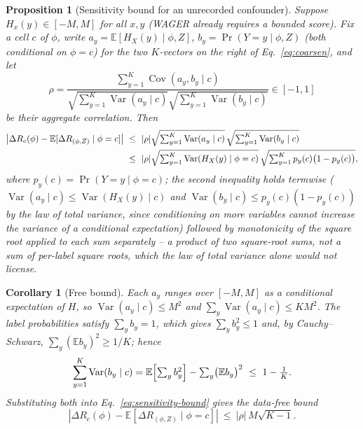 \documentclass[preprint,times,10pt,a4paper]{elsarticle}
\theoremstyle{plain}
\newtheorem{proposition}{Proposition}
\newtheorem{corollary}{Corollary}
\theoremstyle{definition}
\begin{document}
\begin{proposition}[Sensitivity bound for an unrecorded confounder]\label{prop:sensitivity}
Suppose $H_x(y)\in[-M,M]$ for all $x,y$ (WAGER already requires a bounded score). Fix a
cell $c$ of $\phi$, write $a_y=\mathbb E[H_X(y)\mid\phi,Z]$, $b_y=\Pr(Y=y\mid\phi,Z)$
(both conditional on $\phi=c$) for the two $K$-vectors on the right of
Eq.~\eqref{eq:coarsen}, and let
\begin{equation}
\rho=\frac{\sum_{y=1}^K\operatorname{Cov}(a_y,b_y\mid c)}
{\sqrt{\sum_{y=1}^K\operatorname{Var}(a_y\mid c)}\sqrt{\sum_{y=1}^K\operatorname{Var}(b_y\mid c)}}
\in[-1,1]
\end{equation}
be their aggregate correlation. Then
\begin{align}
\left|\Delta R_c(\phi)-\mathbb E[\Delta R_{(\phi,Z)}\mid\phi=c]\right|
&\ \le\ |\rho|\sqrt{\textstyle\sum_{y=1}^K\operatorname{Var}(a_y\mid c)}\,
\sqrt{\textstyle\sum_{y=1}^K\operatorname{Var}(b_y\mid c)}\notag\\
&\ \le\ |\rho|\sqrt{\textstyle\sum_{y=1}^K\operatorname{Var}(H_X(y)\mid\phi=c)}\,
\sqrt{\textstyle\sum_{y=1}^Kp_y(c)\bigl(1-p_y(c)\bigr)},
\label{eq:sensitivity-bound}
\end{align}
where $p_y(c)=\Pr(Y=y\mid\phi=c)$; the second inequality holds termwise
($\operatorname{Var}(a_y\mid c)\le\operatorname{Var}(H_X(y)\mid c)$ and
$\operatorname{Var}(b_y\mid c)\le p_y(c)(1-p_y(c))$ by the law of total variance, since
conditioning on more variables cannot increase the variance of a conditional
expectation) followed by monotonicity of the square root applied to each sum
separately -- a product of two square-root sums, not a sum of per-label square roots,
which the law of total variance alone would not license.
\end{proposition}

\begin{corollary}[Free bound]\label{cor:sensitivity-crude}
Each $a_y$ ranges over $[-M,M]$ as a conditional expectation of $H$, so
$\operatorname{Var}(a_y\mid c)\le M^2$ and $\sum_y\operatorname{Var}(a_y\mid c)\le KM^2$.
The label probabilities satisfy $\sum_yb_y=1$, which gives $\sum_yb_y^2\le1$ and, by
Cauchy--Schwarz, $\sum_y(\mathbb E b_y)^2\ge1/K$; hence
\begin{equation}
\sum_{y=1}^K\operatorname{Var}(b_y\mid c)
=\mathbb E\Bigl[\textstyle\sum_yb_y^2\Bigr]-\sum_y\bigl(\mathbb E b_y\bigr)^2
\ \le\ 1-\frac1K .
\label{eq:simplex-var}
\end{equation}
Substituting both into Eq.~\eqref{eq:sensitivity-bound} gives the data-free bound
\begin{equation}
\left|\Delta R_c(\phi)-\mathbb E[\Delta R_{(\phi,Z)}\mid\phi=c]\right|
\ \le\ |\rho|\,M\sqrt{K-1}.
\label{eq:sensitivity-crude}
\end{equation}
\end{corollary}
\end{document}
